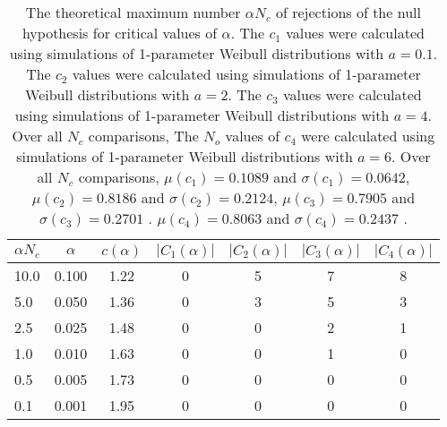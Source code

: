 \begin{table}[h!]
\begin{center}
\begin{tabular}{| l | c | c | c | c | c | c |}\hline
$\alpha N_c$ & $\alpha$ & $c(\alpha)$ & $|C_1(\alpha)|$ & $|C_2(\alpha)|$ & $|C_3(\alpha)|$ & $|C_4(\alpha)|$ \\\hline
10.0 & 0.100 & 1.22 & 0 & 5 & 7 & 8 \\\hline
5.0 & 0.050 & 1.36 & 0 & 3 & 5 & 3 \\\hline
2.5 & 0.025 & 1.48 & 0 & 0 & 2 & 1 \\\hline
1.0 & 0.010 & 1.63 & 0 & 0 & 1 & 0 \\\hline
0.5 & 0.005 & 1.73 & 0 & 0 & 0 & 0 \\\hline
0.1 & 0.001 & 1.95 & 0 & 0 & 0 & 0 \\\hline
\end{tabular}
\caption{The theoretical maximum number $\alpha N_c$ of rejections
        of the null hypothesis for critical values of $\alpha$.
        The $c_1$ values were calculated using simulations of 1-parameter Weibull distributions with $a=0.1$.
        The $c_2$ values were calculated using simulations of 1-parameter Weibull distributions with $a=2$.
        The $c_3$ values were calculated using simulations of 1-parameter Weibull distributions with $a=4$.
        Over all $N_c$ comparisons,
        The $N_o$ values of $c_4$ were calculated using simulations of
         1-parameter Weibull distributions with $a=6$.
        Over all $N_c$ comparisons,
         $\mu(c_1)=0.1089$ and $\sigma(c_1)=0.0642$,
         $\mu(c_2)=0.8186$ and $\sigma(c_2)=0.2124$,
         $\mu(c_3)=0.7905$ and $\sigma(c_3)=0.2701$ .
         $\mu(c_4)=0.8063$ and $\sigma(c_4)=0.2437$ .
        }
\end{center}
\end{table}